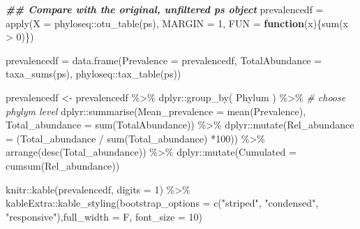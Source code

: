 \documentclass[
]{book}
\newenvironment{Shaded}{\begin{snugshade}}{\end{snugshade}}
\newcommand{\AttributeTok}[1]{\textcolor[rgb]{0.77,0.63,0.00}{#1}}
\newcommand{\CommentTok}[1]{\textcolor[rgb]{0.56,0.35,0.01}{\textit{#1}}}
\newcommand{\ControlFlowTok}[1]{\textcolor[rgb]{0.13,0.29,0.53}{\textbf{#1}}}
\newcommand{\DecValTok}[1]{\textcolor[rgb]{0.00,0.00,0.81}{#1}}
\newcommand{\DocumentationTok}[1]{\textcolor[rgb]{0.56,0.35,0.01}{\textbf{\textit{#1}}}}
\newcommand{\FunctionTok}[1]{\textcolor[rgb]{0.00,0.00,0.00}{#1}}
\newcommand{\NormalTok}[1]{#1}
\newcommand{\OtherTok}[1]{\textcolor[rgb]{0.56,0.35,0.01}{#1}}
\newcommand{\SpecialCharTok}[1]{\textcolor[rgb]{0.00,0.00,0.00}{#1}}
\newcommand{\StringTok}[1]{\textcolor[rgb]{0.31,0.60,0.02}{#1}}
\begin{document}
\begin{Shaded}
\begin{Highlighting}[]
\DocumentationTok{\#\# Compare with the original, unfiltered ps object}
\NormalTok{prevalencedf }\OtherTok{=} \FunctionTok{apply}\NormalTok{(}\AttributeTok{X =}\NormalTok{ phyloseq}\SpecialCharTok{::}\FunctionTok{otu\_table}\NormalTok{(ps),}
                       \AttributeTok{MARGIN =} \DecValTok{1}\NormalTok{,}
                       \AttributeTok{FUN =} \ControlFlowTok{function}\NormalTok{(x)\{}\FunctionTok{sum}\NormalTok{(x }\SpecialCharTok{\textgreater{}} \DecValTok{0}\NormalTok{)\})}

\NormalTok{prevalencedf }\OtherTok{=} \FunctionTok{data.frame}\NormalTok{(}\AttributeTok{Prevalence =}\NormalTok{ prevalencedf,}
                            \AttributeTok{TotalAbundance =} \FunctionTok{taxa\_sums}\NormalTok{(ps),}
\NormalTok{                            phyloseq}\SpecialCharTok{::}\FunctionTok{tax\_table}\NormalTok{(ps))}

\NormalTok{prevalencedf }\OtherTok{\textless{}{-}}\NormalTok{ prevalencedf }\SpecialCharTok{\%\textgreater{}\%}
\NormalTok{    dplyr}\SpecialCharTok{::}\FunctionTok{group\_by}\NormalTok{( Phylum ) }\SpecialCharTok{\%\textgreater{}\%}   \CommentTok{\# choose phylym level}
\NormalTok{    dplyr}\SpecialCharTok{::}\FunctionTok{summarise}\NormalTok{(}\AttributeTok{Mean\_prevalence =} \FunctionTok{mean}\NormalTok{(Prevalence),}
                     \AttributeTok{Total\_abundance =} \FunctionTok{sum}\NormalTok{(TotalAbundance)) }\SpecialCharTok{\%\textgreater{}\%}
\NormalTok{    dplyr}\SpecialCharTok{::}\FunctionTok{mutate}\NormalTok{(}\AttributeTok{Rel\_abundance =}\NormalTok{ (Total\_abundance }\SpecialCharTok{/} \FunctionTok{sum}\NormalTok{(Total\_abundance) }\SpecialCharTok{*}\DecValTok{100}\NormalTok{)) }\SpecialCharTok{\%\textgreater{}\%}
    \FunctionTok{arrange}\NormalTok{(}\FunctionTok{desc}\NormalTok{(Total\_abundance)) }\SpecialCharTok{\%\textgreater{}\%}
\NormalTok{    dplyr}\SpecialCharTok{::}\FunctionTok{mutate}\NormalTok{(}\AttributeTok{Cumulated =} \FunctionTok{cumsum}\NormalTok{(Rel\_abundance))}

\NormalTok{knitr}\SpecialCharTok{::}\FunctionTok{kable}\NormalTok{(prevalencedf, }\AttributeTok{digits =} \DecValTok{1}\NormalTok{) }\SpecialCharTok{\%\textgreater{}\%} 
\NormalTok{  kableExtra}\SpecialCharTok{::}\FunctionTok{kable\_styling}\NormalTok{(}\AttributeTok{bootstrap\_options =} \FunctionTok{c}\NormalTok{(}\StringTok{"striped"}\NormalTok{, }\StringTok{"condensed"}\NormalTok{, }\StringTok{"responsive"}\NormalTok{),}\AttributeTok{full\_width =}\NormalTok{ F, }\AttributeTok{font\_size =} \DecValTok{10}\NormalTok{)}
\end{Highlighting}
\end{Shaded}
\end{document}
